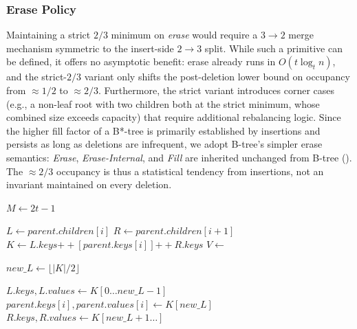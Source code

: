 \documentclass[sigconf]{acmart}
\begin{document}
\subsubsection{Erase Policy}
Maintaining a strict $2/3$ minimum on \textit{erase} would require a  $3 \to 2$ merge mechanism symmetric to the insert-side $2 \to 3$ split. 
While such a primitive can be defined, it offers no asymptotic benefit: erase already runs in $O(t \log_t n)$, and the strict-$2/3$ variant only shifts the post-deletion lower bound on occupancy from $\approx 1/2$ to $\approx 2/3$. 
Furthermore, the strict variant  introduces corner cases (e.g., a non-leaf root with two children both at the strict minimum, whose combined size exceeds capacity) that require additional rebalancing logic. 
Since the higher fill factor of a B*-tree is primarily established by insertions and persists as long as deletions are infrequent, we adopt B-tree's simpler erase semantics: \textit{Erase}, \textit{Erase-Internal}, and \textit{Fill} are inherited unchanged from B-tree (). 
The $\approx 2/3$ occupancy is thus a statistical tendency from insertions, not an invariant maintained on every deletion.

\begin{algorithm}[tbp]
\caption{B* Tree Split and Redistribution}
\label{alg:bstar-split}
\begin{algorithmic}[1]
    \State $M \gets 2t - 1$
        \State {}
        \State \Return
        \State {}
        \State \Return
    \EndIf
    
        \State {}
        \State {}
    \Else
        \State {}
    \EndIf
\EndProcedure

    \State $L \gets parent.children[i]$
    \State $R \gets parent.children[i+1]$
    \State $K \gets L.keys \mathbin{++} [parent.keys[i]] \mathbin{++} R.keys$
    \State $V \gets$ 
    
    \State $new\_L \gets \lfloor |K| / 2 \rfloor$
    
    \State $L.keys, L.values \gets K[0 \dots new\_L - 1]$
    \State $parent.keys[i], parent.values[i] \gets K[new\_L]$
    \State $R.keys, R.values \gets K[new\_L + 1 \dots]$
    \State {}
\EndProcedure
\end{algorithmic}
\end{algorithm}
\end{document}
